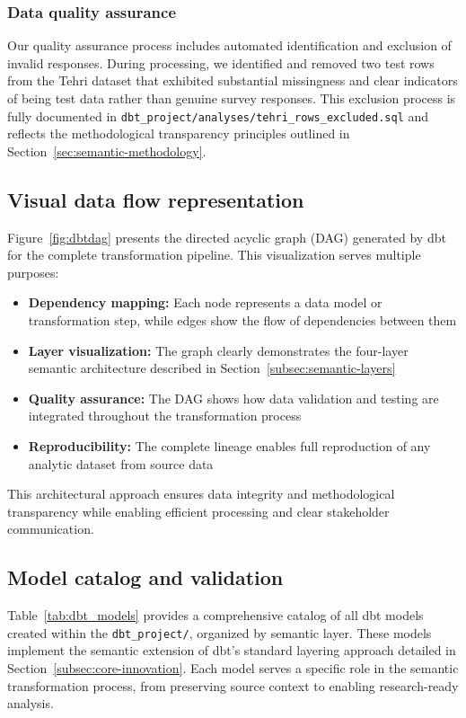 \subsubsection{Data quality assurance}

Our quality assurance process includes automated identification and exclusion of invalid responses. During processing, we identified and removed two test rows from the Tehri dataset that exhibited substantial missingness and clear indicators of being test data rather than genuine survey responses. This exclusion process is fully documented in \texttt{dbt\_project/analyses/tehri\_rows\_excluded.sql} and reflects the methodological transparency principles outlined in Section~\ref{sec:semantic-methodology}.

\subsection{Visual data flow representation}

Figure~\ref{fig:dbtdag} presents the directed acyclic graph (DAG) generated by dbt for the complete transformation pipeline. This visualization serves multiple purposes:

\begin{itemize}
    \item \textbf{Dependency mapping:} Each node represents a data model or transformation step, while edges show the flow of dependencies between them
    \item \textbf{Layer visualization:} The graph clearly demonstrates the four-layer semantic architecture described in Section~\ref{subsec:semantic-layers}
    \item \textbf{Quality assurance:} The DAG shows how data validation and testing are integrated throughout the transformation process
    \item \textbf{Reproducibility:} The complete lineage enables full reproduction of any analytic dataset from source data
\end{itemize}

This architectural approach ensures data integrity and methodological transparency while enabling efficient processing and clear stakeholder communication.

\subsection{Model catalog and validation}

Table~\ref{tab:dbt_models} provides a comprehensive catalog of all dbt models created within the \texttt{dbt\_project/}, organized by semantic layer. These models implement the semantic extension of dbt's standard layering approach detailed in Section~\ref{subsec:core-innovation}. Each model serves a specific role in the semantic transformation process, from preserving source context to enabling research-ready analysis.

